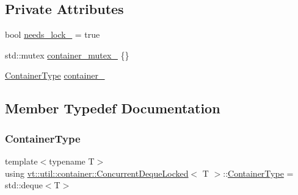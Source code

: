 \subsection*{Private Attributes}
\begin{DoxyCompactItemize}
\item 
bool \hyperlink{structvt_1_1util_1_1container_1_1_concurrent_deque_locked_af681c689f7800fca7e35364aeffd9964}{needs\+\_\+lock\+\_\+} = true
\item 
std\+::mutex \hyperlink{structvt_1_1util_1_1container_1_1_concurrent_deque_locked_a8e3bf213b7580d8d7c9f9bc926ac21b4}{container\+\_\+mutex\+\_\+} \{\}
\item 
\hyperlink{structvt_1_1util_1_1container_1_1_concurrent_deque_locked_ab8d922cda54539b322830391268284bb}{Container\+Type} \hyperlink{structvt_1_1util_1_1container_1_1_concurrent_deque_locked_a5055eeb8cdb93e4e9fb84deb237998f2}{container\+\_\+}
\end{DoxyCompactItemize}


\subsection{Member Typedef Documentation}
\mbox{\label{structvt_1_1util_1_1container_1_1_concurrent_deque_locked_ab8d922cda54539b322830391268284bb}} 
\subsubsection{\texorpdfstring{Container\+Type}{ContainerType}}
{\footnotesize\ttfamily template$<$typename T$>$ \\
using \hyperlink{structvt_1_1util_1_1container_1_1_concurrent_deque_locked}{vt\+::util\+::container\+::\+Concurrent\+Deque\+Locked}$<$ T $>$\+::\hyperlink{structvt_1_1util_1_1container_1_1_concurrent_deque_locked_ab8d922cda54539b322830391268284bb}{Container\+Type} =  std\+::deque$<$T$>$}

\mbox{\label{structvt_1_1util_1_1container_1_1_concurrent_deque_locked_a6f35f4923f1329d25378656b0582e916}} 
